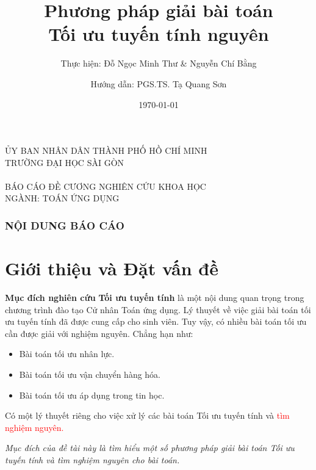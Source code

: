 \documentclass[10pt]{beamer}
\title{Phương pháp giải bài toán \\ Tối ưu tuyến tính nguyên}
\date{\today}
\author{Hướng dẫn: PGS.TS. Tạ Quang Sơn}
\institute{Sinh viên lớp: DTU1221, Khóa: 22 @ Trường Đại học Sài Gòn}
\subtitle{Thực hiện: Đỗ Ngọc Minh Thư \& Nguyễn Chí Bằng}
\begin{document}
\begin{frame}
  \centering
  {\footnotesize
  ỦY BAN NHÂN DÂN THÀNH PHỐ HỒ CHÍ MINH\\
  TRƯỜNG ĐẠI HỌC SÀI GÒN}\\
  \phantom{space}\\
  {\normalsize BÁO CÁO ĐỀ CƯƠNG NGHIÊN CỨU KHOA HỌC\\
  NGÀNH: TOÁN ỨNG DỤNG}\\[-50pt]
  \titlepage
\end{frame}

\begin{frame}
    \frametitle{NỘI DUNG BÁO CÁO}
    \tableofcontents
\end{frame}

\section{Giới thiệu và Đặt vấn đề}

\begin{frame}{\bf Mục đích nghiên cứu}
\textbf{Tối ưu tuyến tính} là một nội dung quan trọng trong chương trình đào tạo Cử nhân Toán ứng dụng. Lý thuyết về việc giải bài toán tối ưu tuyến tính đã được cung cấp cho sinh viên. Tuy vậy, có nhiều bài toán tối ưu cần được giải với nghiệm nguyên. Chẳng hạn như:
\begin{itemize}
\item Bài toán tối ưu nhân lực.
\item Bài toán tối ưu vận chuyển hàng hóa.
\item Bài toán tối ưu áp dụng trong tin học.
\end{itemize}

\bigskip
Có một lý thuyết riêng cho việc xử lý các bài toán Tối ưu tuyến tính và \textcolor{red}{tìm nghiệm nguyên.}
\bigskip

{\it Mục đích của đề tài này là tìm hiểu một số phương pháp giải bài toán Tối ưu tuyến tính và tìm nghiệm nguyên cho bài toán.}
\end{frame}
\end{document}
